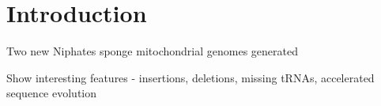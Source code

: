 \documentclass[../main.tex]{subfiles}
\begin{document}
\newpage
\section{Introduction}
Two new Niphates sponge mitochondrial genomes generated

Show interesting features - insertions, deletions, missing tRNAs, accelerated sequence evolution
\end{document}
